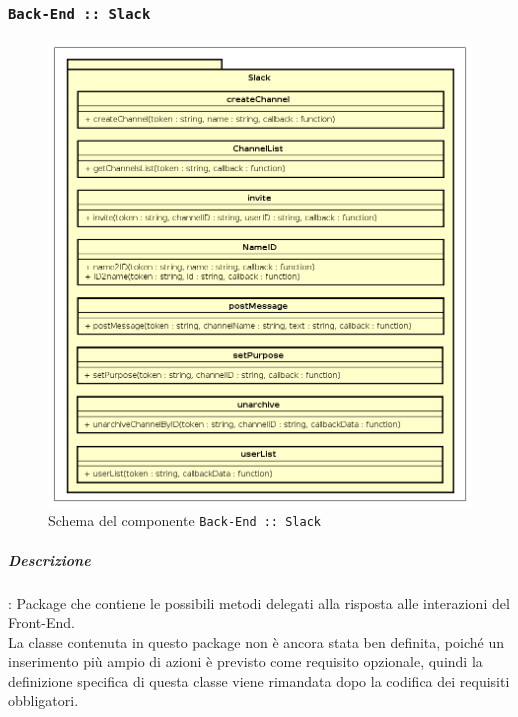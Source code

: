 \documentclass[../DefinizioneDiProdotto_v2.0.0.tex]{subfiles}
\begin{document}
\newpage
\subsubsection{\texttt{Back-End :: Slack}}
\begin{figure}[!h]
	\centering
	\includegraphics[scale=0.6]{Architettura/Back-End/Slack.png}
	\caption{Schema del componente \texttt{Back-End :: Slack}}
\end{figure}
\subparagraph{Descrizione}: Package che contiene le possibili metodi delegati alla risposta alle interazioni del Front-End.\\
La classe contenuta in questo package non è ancora stata ben definita, poiché un inserimento più ampio di azioni è previsto come requisito opzionale, quindi la definizione specifica di questa classe viene rimandata dopo la codifica dei requisiti obbligatori.
\end{document}
